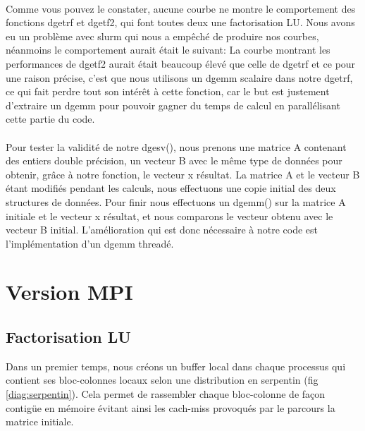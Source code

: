 \documentclass{article}
\begin{document}
\paragraph{}Comme vous pouvez le constater, aucune courbe ne montre le comportement des fonctions dgetrf et dgetf2, qui font toutes deux une factorisation LU. Nous avons eu un problème avec slurm qui nous a empêché de produire nos courbes, néanmoins le comportement aurait était le suivant: La courbe montrant les performances de dgetf2 aurait était beaucoup élevé que celle de dgetrf et ce pour une raison précise, c'est que nous utilisons un dgemm scalaire dans notre dgetrf, ce qui fait perdre tout son intérêt à cette fonction, car le but est justement d'extraire un dgemm pour pouvoir gagner du temps de calcul en parallélisant cette partie du code.

\paragraph{}Pour tester la validité de notre dgesv(), nous prenons une matrice A contenant des entiers double précision, un vecteur B avec le même type de données pour obtenir, grâce à notre fonction, le vecteur x résultat. La matrice A et le vecteur B étant modifiés pendant les calculs, nous effectuons une copie initial des deux structures de données. Pour finir nous effectuons un dgemm() sur la matrice A initiale et le vecteur x résultat, et nous comparons le vecteur obtenu avec le vecteur B initial. L'amélioration qui est donc nécessaire à notre code est l'implémentation d'un dgemm threadé.

\section{Version MPI}
\subsection{Factorisation LU}
Dans un premier temps, nous créons un buffer local dans chaque processus qui contient ses bloc-colonnes locaux selon une distribution en serpentin (fig \ref{diag:serpentin}). Cela permet de rassembler chaque bloc-colonne de façon contigüe en mémoire évitant ainsi les cach-miss provoqués par le parcours la matrice initiale.
\end{document}
